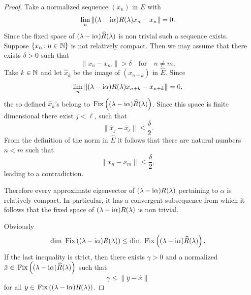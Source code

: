 \begin{proof}
Take a normalized sequence $(x_{n})$ in $E$ with
\[
\lim_{n}\|(\lambda - \mathrm{i}\alpha)R(\lambda)x_{n} - x_{n}\| = 0 .
\]
Since the fixed space of {$(\lambda-\mathrm{i}\alpha)\widehat{R}(\lambda)$} is non trivial such a sequence exists.
Suppose $\{ x_{n} \colon n\in\mathbb{N} \}$ is not relatively compact.
Then we may assume that there exists $\delta > 0$ such that
\[
	\|x_{n} - x_{m}\| > \delta \quad \text{for} \quad n \neq m .
\]
Take $k \in \mathbb{N} $ and let $\hat{x}_{k}$ be the image of\/ $(x_{n+k})$ in $\widehat{E}$.
Since
\[
	\lim_{n}\|(\lambda - \mathrm{i}\alpha)R(\lambda)x_{n+k} - x_{n+k}\| = 0 ,
\]
the so defined $\hat{x}_{k}$'s belong to $\mathop{}\mathrm{Fix}\left((\lambda - \mathrm{i}\alpha)\widehat{R}(\lambda)\right)$.
Since this space is finite dimensional there exist $j < \ell$,  such that
\[
	\|\hat{x}_{j} - \hat{x}_{\ell}\| \leq \frac{\delta}{2} .
\]
From the definition of the norm in $\widehat{E}$ it follows that there are natural numbers $n < m$ such that
\[
\|x_{n} - x_{m}\| \leq \frac{\delta}{2} ,
\]
leading to a contradiction.

Therefore every approximate eigenvector of\/ $(\lambda - \mathrm{i}\alpha)R(\lambda)$ pertaining to $\alpha$ is relatively compact.
In particular, it has a convergent subsequence from which it follows that the fixed space of\/ $(\lambda - \mathrm{i}\alpha)R(\lambda)$ is non trivial.

Obviously
\[
\dim \Fix{(\lambda - \im\alpha)R(\lambda)} \leq \dim \Fix{(\lambda - \im\alpha)\widehat{R}(\lambda)} .
\]
If the last inequality is strict, then there exists $\gamma > 0$ and a normalized 
$\hat{x} \in \mathop{}\mathrm{Fix}\left((\lambda - \mathrm{i}\alpha)\widehat{R}(\lambda)\right)$ such that
\[
\gamma \leq \|\hat{y} - \hat{x}\|
\]
for all $y \in \mathop{}\mathrm{Fix}\left((\lambda - \mathrm{i}\alpha)R(\lambda)\right)$.


\end{proof}
